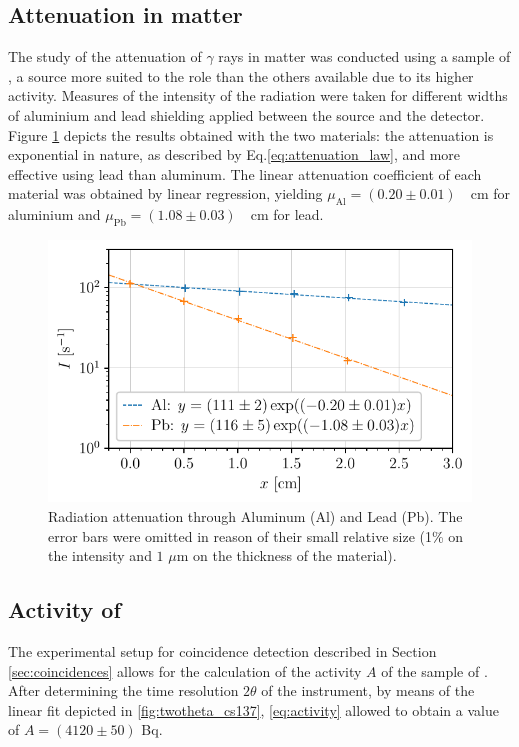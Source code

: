 \subsection{Attenuation in matter}
The study of the attenuation of $\gamma$ rays in matter was conducted using 
a sample of \cesium, a source more suited to the role than 
the others available due to its higher activity.
Measures of the intensity of the radiation were taken for
different widths of aluminium and lead shielding applied 
between the source and the detector.
Figure \ref{fig:attenuation_coefficient} depicts the results obtained with 
the two materials:
the attenuation is exponential in nature, as described 
by Eq.\eqref{eq:attenuation_law}, and more effective using lead than aluminum.
The linear attenuation coefficient of each material was obtained by linear regression, yielding \mbox{$\mu_{\mathrm{Al}} = (0.20 \pm 0.01)$ \unit{\per\cm}} for aluminium
and \mbox{$\mu_{\mathrm{Pb}} = (1.08 \pm 0.03)$ \unit{\per\cm}} for lead.
\begin{figure}[htbp]
    \centering
    \includegraphics[scale=1]{figures/attenuation_coefficient.pdf}
    \caption{Radiation attenuation through Aluminum (Al) and Lead (Pb). 
             The error bars were omitted in reason of their small relative size 
             (1\% on the intensity and $1$ $\mu$m on the thickness of the material).}
    \label{fig:attenuation_coefficient}
\end{figure}


\subsection{Activity of \cobalt}
The experimental setup for coincidence detection described 
in Section \ref{sec:coincidences} allows for the calculation
of the activity $A$ of the sample of \cobalt.
After determining the time resolution $2\theta$ of 
the instrument, by means of the linear fit depicted in
\autoref{fig:twotheta_cs137}, \autoref{eq:activity} allowed 
to obtain a value of $A= (4120 \pm 50)$ Bq.

